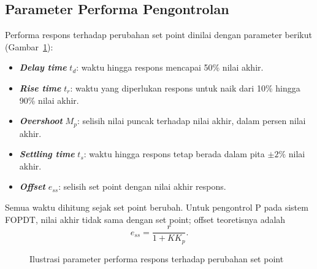 \documentclass[11pt,a4paper]{article}
\begin{document}
\subsection{Parameter Performa Pengontrolan}
Performa respons terhadap perubahan set point dinilai dengan parameter berikut (Gambar~\ref{fig:performa}):
\begin{itemize}
\item \textbf{\textit{Delay time}} $t_d$: waktu hingga respons mencapai 50\% nilai akhir.
\item \textbf{\textit{Rise time}} $t_r$: waktu yang diperlukan respons untuk naik dari 10\% hingga 90\% nilai akhir.
\item \textbf{\textit{Overshoot}} $M_p$: selisih nilai puncak terhadap nilai akhir, dalam persen nilai akhir.
\item \textbf{\textit{Settling time}} $t_s$: waktu hingga respons tetap berada dalam pita $\pm 2\%$ nilai akhir.
\item \textbf{\textit{Offset}} $e_{ss}$: selisih set point dengan nilai akhir respons.
\end{itemize}
Semua waktu dihitung sejak set point berubah. Untuk pengontrol P pada sistem FOPDT, nilai akhir tidak sama dengan set point; offset teoretisnya adalah
\begin{equation}
e_{ss} = \frac{r}{1 + K K_p}.
\label{eq:offset}
\end{equation}

\begin{figure}[H]
\centering
{}
\caption{Ilustrasi parameter performa respons terhadap perubahan set point}
\label{fig:performa}
\end{figure}
\end{document}
